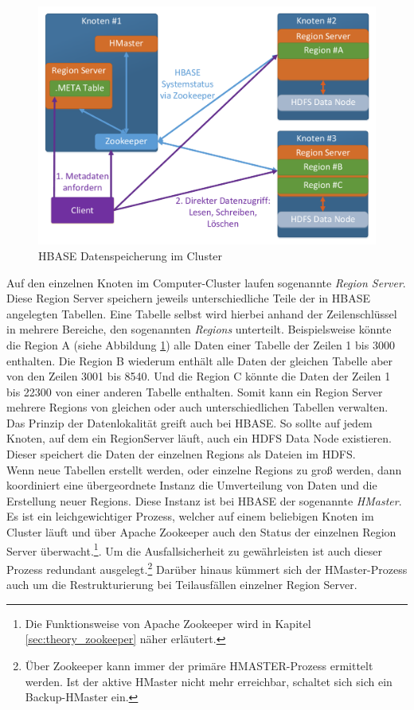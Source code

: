 \begin{figure}[ht]
  \centering
  \includegraphics[width=\textwidth]{./resource/hbase_cluster_architecture.pdf}
  \caption{HBASE Datenspeicherung im Cluster}
  \label{fig:hbase_cluster_architecture}
\end{figure}

\noindent
Auf den einzelnen Knoten im Computer-Cluster laufen sogenannte \textit{Region Server}. Diese Region Server speichern jeweils unterschiedliche Teile der in HBASE angelegten Tabellen. Eine Tabelle selbst wird hierbei anhand der Zeilenschlüssel in mehrere Bereiche, den sogenannten \textit{Regions} unterteilt. Beispielsweise könnte die Region A (siehe Abbildung \ref{fig:hbase_cluster_architecture}) alle Daten einer Tabelle der Zeilen 1 bis 3000 enthalten. Die Region B wiederum enthält alle Daten der gleichen Tabelle aber von den Zeilen 3001 bis 8540. Und die Region C könnte die Daten der Zeilen 1 bis 22300 von einer anderen Tabelle enthalten. Somit kann ein Region Server mehrere Regions von gleichen oder auch unterschiedlichen Tabellen verwalten.  Das Prinzip der Datenlokalität greift auch bei HBASE. So sollte auf  jedem Knoten, auf dem ein RegionServer läuft, auch ein HDFS Data Node existieren. Dieser speichert die Daten der einzelnen Regions als Dateien im HDFS.\\

\noindent
Wenn neue Tabellen erstellt werden, oder einzelne Regions zu groß werden, dann koordiniert eine übergeordnete Instanz die Umverteilung von Daten und die Erstellung neuer Regions. Diese Instanz ist bei HBASE der sogenannte \textit{HMaster}. Es ist ein leichgewichtiger Prozess, welcher auf einem beliebigen Knoten im Cluster läuft und über Apache Zookeeper auch den Status der einzelnen Region Server überwacht.\footnote{Die Funktionsweise von Apache Zookeeper wird in Kapitel \ref{sec:theory_zookeeper} näher erläutert.}. Um die Ausfallsicherheit zu gewährleisten ist auch dieser Prozess redundant ausgelegt.\footnote{Über Zookeeper kann immer der primäre HMASTER-Prozess ermittelt werden. Ist der aktive HMaster nicht mehr erreichbar, schaltet sich sich ein Backup-HMaster ein.} Darüber hinaus kümmert sich der HMaster-Prozess auch um die Restrukturierung bei Teilausfällen einzelner Region Server. 

